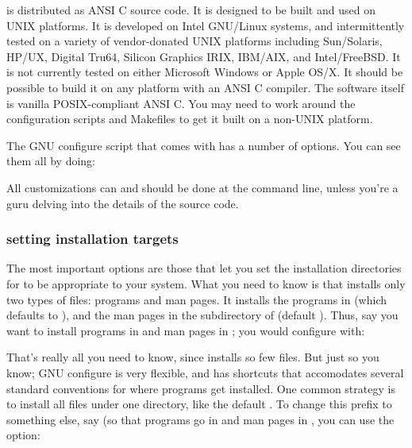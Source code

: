 is distributed as ANSI C source code.
It is designed to be built and used on UNIX platforms. It is developed
on Intel GNU/Linux systems, and intermittently tested on a variety of
vendor-donated UNIX platforms including Sun/Solaris, HP/UX, Digital
Tru64, Silicon Graphics IRIX, IBM/AIX, and Intel/FreeBSD. It is not
currently tested on either Microsoft Windows or Apple OS/X. It should
be possible to build it on any platform with an ANSI C compiler. The
software itself is vanilla POSIX-compliant ANSI C. You may need to
work around the configuration scripts and Makefiles to get it built on
a non-UNIX platform.

The GNU configure script that comes with  has a
number of options. You can see them all by doing:


All customizations can and should be done at the 
command line, unless you're a guru delving into the details of the
source code.

\subsubsection{setting installation targets}

The most important options are those that let you set the installation
directories for  to be appropriate to your system.
What you need to know is that  installs only two
types of files: programs and man pages. It installs the programs in
 (which defaults to ), and the man pages in the
 subdirectory of  (default
). Thus, say you want  to install programs
in  and man pages in
; you would configure with:


That's really all you need to know, since  installs
so few files. But just so you know; GNU configure is very flexible,
and has shortcuts that accomodates several standard conventions for
where programs get installed. One common strategy is to install all
files under one directory, like the default . To
change this prefix to something else, say 
(so that programs go in  and man pages in
, you can use the 
option:


